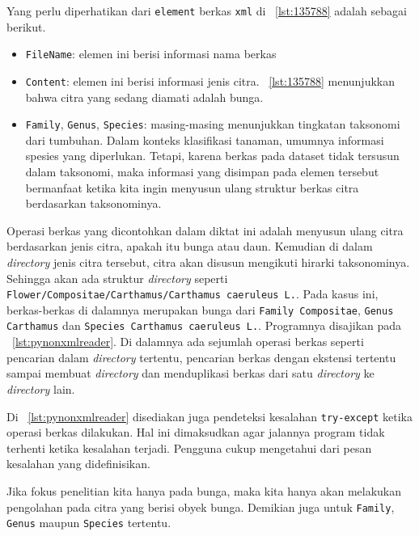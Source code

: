 Yang perlu diperhatikan dari \texttt{element} berkas \texttt{xml} di \lstlistingname~\ref{lst:135788} adalah sebagai berikut.
\begin{itemize}
  \item \texttt{FileName}: elemen ini berisi informasi nama berkas
  \item \texttt{Content}: elemen ini berisi informasi jenis citra. \lstlistingname~\ref{lst:135788} menunjukkan bahwa citra yang sedang diamati adalah bunga.
  \item \texttt{Family}, \texttt{Genus}, \texttt{Species}: masing-masing menunjukkan tingkatan taksonomi dari tumbuhan. Dalam konteks klasifikasi tanaman, umumnya informasi spesies yang diperlukan. Tetapi, karena berkas pada dataset tidak tersusun dalam taksonomi, maka informasi yang disimpan pada elemen tersebut bermanfaat ketika kita ingin menyusun ulang struktur berkas citra berdasarkan taksonominya.
\end{itemize}

Operasi berkas yang dicontohkan dalam diktat ini adalah menyusun ulang citra berdasarkan jenis citra, apakah itu bunga atau daun. Kemudian di dalam \textit{directory} jenis citra tersebut, citra akan disusun mengikuti hirarki taksonominya. Sehingga akan ada struktur \textit{directory} seperti \texttt{Flower/Compositae/Carthamus/Carthamus\ caeruleus\ L.}. Pada kasus ini, berkas-berkas di dalamnya merupakan bunga dari \texttt{Family Compositae}, \texttt{Genus Carthamus} dan \texttt{Species Carthamus\ caeruleus\ L.}. Programnya disajikan pada \lstlistingname~\ref{lst:pynonxmlreader}. Di dalamnya ada sejumlah operasi berkas seperti pencarian dalam \textit{directory} tertentu, pencarian berkas dengan ekstensi tertentu sampai membuat \textit{directory} dan menduplikasi berkas dari satu \textit{directory} ke \textit{directory} lain.

\scriptsize

\normalsize

Di \lstlistingname~\ref{lst:pynonxmlreader} disediakan juga pendeteksi kesalahan \texttt{try-except} ketika operasi berkas dilakukan. Hal ini dimaksudkan agar jalannya program tidak terhenti ketika kesalahan terjadi. Pengguna cukup mengetahui dari pesan kesalahan yang didefinisikan.

Jika fokus penelitian kita hanya pada bunga, maka kita hanya akan melakukan pengolahan pada citra yang berisi obyek bunga. Demikian juga untuk \texttt{Family}, \texttt{Genus} maupun \texttt{Species} tertentu.

